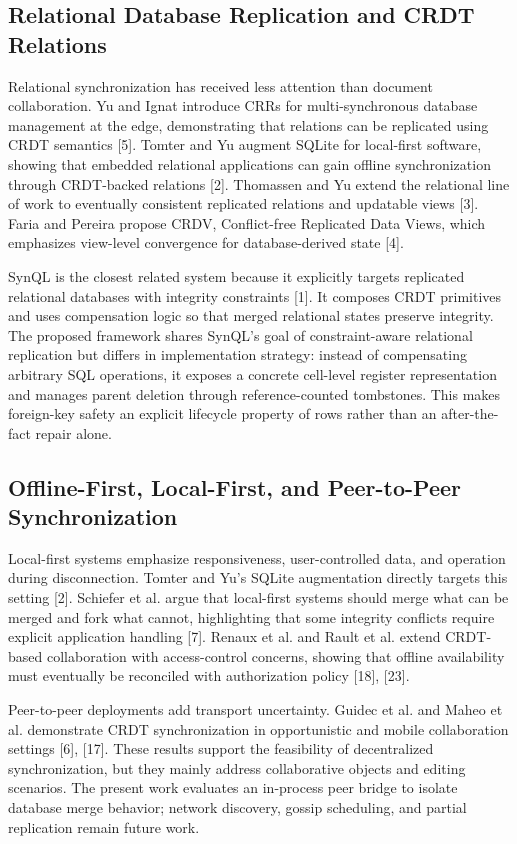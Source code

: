 \documentclass[pdflatex,sn-mathphys-num]{sn-jnl}
\begin{document}
\subsection{Relational Database Replication and CRDT Relations}

Relational synchronization has received less attention than document collaboration. Yu and Ignat introduce CRRs for multi-synchronous database management at the edge, demonstrating that relations can be replicated using CRDT semantics [5]. Tomter and Yu augment SQLite for local-first software, showing that embedded relational applications can gain offline synchronization through CRDT-backed relations [2]. Thomassen and Yu extend the relational line of work to eventually consistent replicated relations and updatable views [3]. Faria and Pereira propose CRDV, Conflict-free Replicated Data Views, which emphasizes view-level convergence for database-derived state [4].

SynQL is the closest related system because it explicitly targets replicated relational databases with integrity constraints [1]. It composes CRDT primitives and uses compensation logic so that merged relational states preserve integrity. The proposed framework shares SynQL's goal of constraint-aware relational replication but differs in implementation strategy: instead of compensating arbitrary SQL operations, it exposes a concrete cell-level register representation and manages parent deletion through reference-counted tombstones. This makes foreign-key safety an explicit lifecycle property of rows rather than an after-the-fact repair alone.

\subsection{Offline-First, Local-First, and Peer-to-Peer Synchronization}

Local-first systems emphasize responsiveness, user-controlled data, and operation during disconnection. Tomter and Yu's SQLite augmentation directly targets this setting [2]. Schiefer et al. argue that local-first systems should merge what can be merged and fork what cannot, highlighting that some integrity conflicts require explicit application handling [7]. Renaux et al. and Rault et al. extend CRDT-based collaboration with access-control concerns, showing that offline availability must eventually be reconciled with authorization policy [18], [23].

Peer-to-peer deployments add transport uncertainty. Guidec et al. and Maheo et al. demonstrate CRDT synchronization in opportunistic and mobile collaboration settings [6], [17]. These results support the feasibility of decentralized synchronization, but they mainly address collaborative objects and editing scenarios. The present work evaluates an in-process peer bridge to isolate database merge behavior; network discovery, gossip scheduling, and partial replication remain future work.
\end{document}
